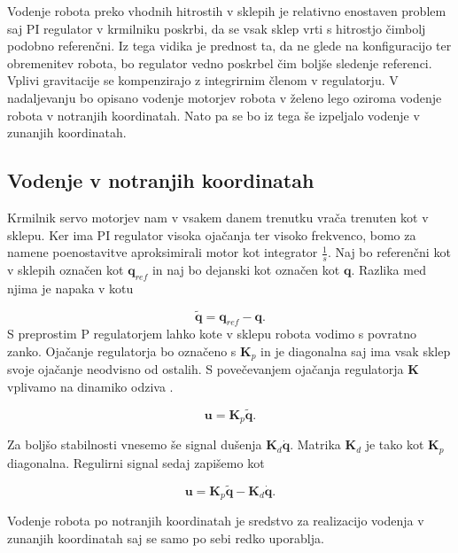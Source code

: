 \documentclass[a4paper]{article}
\begin{document}
Vodenje robota preko vhodnih hitrostih v sklepih je relativno enostaven problem saj PI regulator v krmilniku poskrbi, da se vsak sklep vrti s hitrostjo čimbolj podobno referenčni. Iz tega vidika je prednost ta, da ne glede na konfiguracijo ter obremenitev robota, bo regulator vedno poskrbel čim boljše sledenje referenci. Vplivi gravitacije se kompenzirajo z integrirnim členom v regulatorju. V nadaljevanju bo opisano vodenje motorjev robota v želeno lego oziroma vodenje robota v notranjih koordinatah. Nato pa se bo iz tega še izpeljalo vodenje v zunanjih koordinatah.


\subsection{Vodenje v notranjih koordinatah} \label{sec:admit_inner}

Krmilnik servo motorjev nam v vsakem danem trenutku vrača trenuten kot v sklepu. Ker ima PI regulator visoka ojačanja ter visoko frekvenco, bomo za namene poenostavitve aproksimirali motor kot integrator $\frac{1}{s}$. Naj bo referenčni kot v sklepih označen kot $\textbf{q}_{ref}$ in naj bo dejanski kot označen kot $\textbf{q}$. Razlika med njima je napaka v kotu 

\begin{equation}
\tilde{\textbf{q}} = \textbf{q}_{ref} - \textbf{q}.
\end{equation}
S preprostim P regulatorjem lahko kote v sklepu robota vodimo s povratno zanko. Ojačanje regulatorja bo označeno s $\textbf{K}_p$ in je diagonalna saj ima vsak sklep svoje ojačanje neodvisno od ostalih. S povečevanjem ojačanja regulatorja \textbf{K} vplivamo na dinamiko odziva \cite{zupancic_tr}.

\begin{equation} \label{eq:p_reg_q}
\textbf{u} = \textbf{K}_p  \tilde{\textbf{q}}.
\end{equation}


Za boljšo stabilnosti vnesemo še signal dušenja $\textbf{K}_d \dot{\mathbf{q}}$. Matrika $\textbf{K}_d$ je tako kot $\textbf{K}_p$ diagonalna. Regulirni signal sedaj zapišemo kot

\begin{equation} \label{eq:pd_reg_q}
\textbf{u} = \textbf{K}_p \tilde{\mathbf{q}} - \textbf{K}_d \dot{\mathbf{q}}.
\end{equation}

Vodenje robota po notranjih koordinatah je sredstvo za realizacijo vodenja v zunanjih koordinatah saj se samo po sebi redko uporablja.
\end{document}
